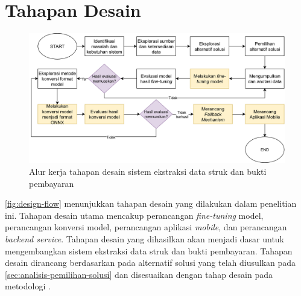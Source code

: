 \section{Tahapan Desain}
\label{sec:tahapan-desain}
\begin{figure}[htbp]
    \centering
    \includegraphics[width=\textwidth]{images/design-flow.png}
    \caption{Alur kerja tahapan desain sistem ekstraksi data struk dan bukti pembayaran}
    \label{fig:design-flow}
\end{figure}

\autoref{fig:design-flow} menunjukkan tahapan desain yang dilakukan dalam penelitian ini. Tahapan desain utama mencakup perancangan \emph{fine-tuning} model, perancangan konversi model, perancangan aplikasi \emph{mobile}, dan perancangan \emph{backend service}. Tahapan desain yang dihasilkan akan menjadi dasar untuk mengembangkan sistem ekstraksi data struk dan bukti pembayaran. Tahapan desain dirancang berdasarkan pada alternatif solusi yang telah diusulkan pada \autoref{sec:analisis-pemilihan-solusi} dan disesuaikan dengan tahap desain pada metodologi \dsrm.



